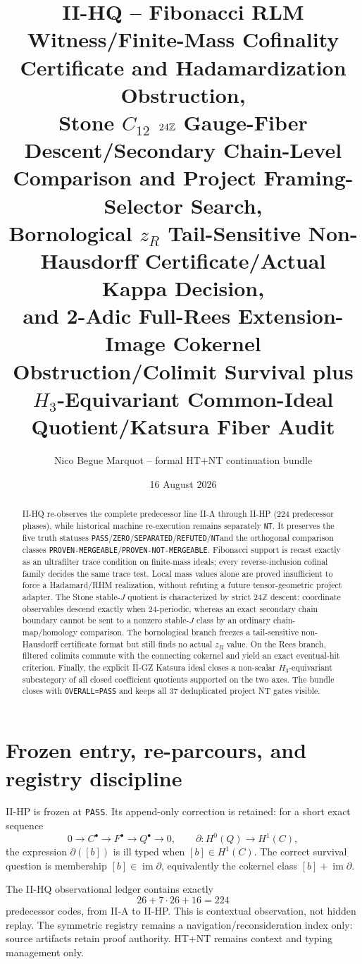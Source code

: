 \documentclass[10pt,a4paper]{article}
\title{\textbf{II-HQ -- Fibonacci RLM Witness/Finite-Mass Cofinality Certificate and Hadamardization Obstruction,}\\
\textbf{Stone $C_{12}$ $24\Z$ Gauge-Fiber Descent/Secondary Chain-Level Comparison and Project Framing-Selector Search,}\\
\textbf{Bornological $z_R$ Tail-Sensitive Non-Hausdorff Certificate/Actual Kappa Decision,}\\
\textbf{and 2-Adic Full-Rees Extension-Image Cokernel Obstruction/Colimit Survival plus $H_3$-Equivariant Common-Ideal Quotient/Katsura Fiber Audit}}
\author{Nico Begue Marquot -- formal HT+NT continuation bundle}
\date{16 August 2026}
\newcommand{\PASS}{\texttt{PASS}}
\newcommand{\NT}{\texttt{NT}}
\newcommand{\REF}{\texttt{REFUTED}}
\newcommand{\ZERO}{\texttt{ZERO}}
\newcommand{\SEP}{\texttt{SEPARATED}}
\newcommand{\PM}{\texttt{PROVEN-MERGEABLE}}
\newcommand{\PNM}{\texttt{PROVEN-NOT-MERGEABLE}}
\newcommand{\Z}{\mathbb Z}
\newcommand{\im}{\operatorname{im}}
\begin{document}
\maketitle\vspace{-1.25em}

\begin{abstract}\small
II-HQ re-observes the complete predecessor line II-A through II-HP (224 predecessor phases), while historical machine re-execution remains separately \NT.  It preserves the five truth statuses \PASS/\ZERO/\SEP/\REF/\NT and the orthogonal comparison classes \PM/\PNM.  Fibonacci support is recast exactly as an ultrafilter trace condition on finite-mass ideals; every reverse-inclusion cofinal family decides the same trace test.  Local mass values alone are proved insufficient to force a Hadamard/RHM realization, without refuting a future tensor-geometric project adapter.  The Stone stable-$J$ quotient is characterized by strict $24\Z$ descent: coordinate observables descend exactly when $24$-periodic, whereas an exact secondary chain boundary cannot be sent to a nonzero stable-$J$ class by an ordinary chain-map/homology comparison.  The bornological branch freezes a tail-sensitive non-Hausdorff certificate format but still finds no actual $z_R$ value.  On the Rees branch, filtered colimits commute with the connecting cokernel and yield an exact eventual-hit criterion.  Finally, the explicit II-GZ Katsura ideal closes a non-scalar $H_3$-equivariant subcategory of all closed coefficient quotients supported on the two axes.  The bundle closes with \texttt{OVERALL=PASS} and keeps all 37 deduplicated project NT gates visible.
\end{abstract}

\section{Frozen entry, re-parcours, and registry discipline}
II-HP is frozen at \PASS.  Its append-only correction is retained: for a short exact sequence
\[
0\to C^\bullet\to F^\bullet\to Q^\bullet\to0,
\qquad
\partial:H^0(Q)\to H^1(C),
\]
the expression $\partial([b])$ is ill typed when $[b]\in H^1(C)$.  The correct survival question is membership $[b]\in\im\partial$, equivalently the cokernel class $[b]+\im\partial$.

The II-HQ observational ledger contains exactly
\[
26+7\cdot26+16=224
\]
predecessor codes, from II-A to II-HP.  This is contextual observation, not hidden replay.  The symmetric registry remains a navigation/reconsideration index only: source artifacts retain proof authority.  HT+NT remains context and typing management only.
\end{document}
